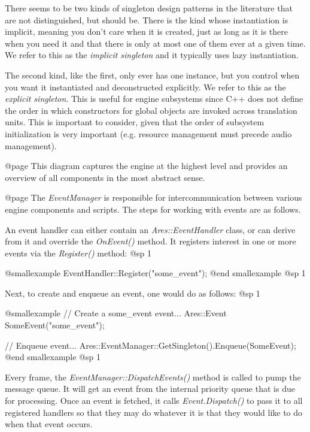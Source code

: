 There seems to be two kinds of singleton design patterns in the literature that are not distinguished, but should be. There is the kind whose instantiation is implicit, meaning you don't care when it is created, just as long as it is there when you need it and that there is only at most one of them ever at a given time. We refer to this as the {\it implicit singleton} and it typically uses lazy instantiation.

The second kind, like the first, only ever has one instance, but you control when you want it instantiated and deconstructed explicitly. We refer to this as the {\it explicit singleton}. This is useful for engine subsystems since C++ does not define the order in which constructors for global objects are invoked across translation units. This is important to consider, given that the order of subsystem initialization is very important (e.g. resource management must precede audio management).

    {}

@page
This diagram captures the engine at the highest level and provides an overview of all components in the most abstract sense.

    {}

@page 
The {\it EventManager} is responsible for intercommunication between various engine components and scripts. The steps for working with events are as follows.

An event handler can either contain an {\it Ares::EventHandler} class, or can derive from it and override the {\it OnEvent()} method. It registers interest in one or more events via the {\it Register()} method:
@sp 1

@smallexample
EventHandler::Register("some_event");
@end smallexample
@sp 1

Next, to create and enqueue an event, one would do as follows:
@sp 1

@smallexample
// Create a some_event event...
Ares::Event SomeEvent("some_event");

// Enqueue event...
Ares::EventManager::GetSingleton().Enqueue(SomeEvent);
@end smallexample
@sp 1

Every frame, the {\it EventManager::DispatchEvents()} method is called to pump the message queue. It will get an event from the internal priority queue that is due for processing. Once an event is fetched, it calls {\it Event.Dispatch()} to pass it to all registered handlers so that they may do whatever it is that they would like to do when that event occurs.

